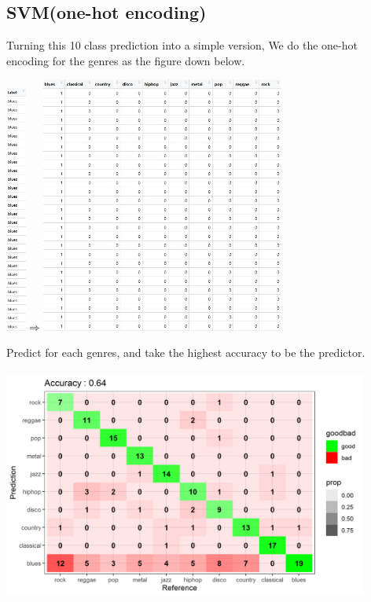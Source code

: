 \documentclass[12pt,a4paper]{article}
\begin{document}
\subsection{SVM(one-hot encoding)}
Turning this 10 class prediction into a simple version, We do the one-hot encoding for the genres as the figure down below.\\
\begin{center}
    \includegraphics[width=0.05\textwidth]{y.jpg}$\Longrightarrow$\includegraphics[width=0.6\textwidth]{y_matrix.jpg}
\end{center}
\newpage
Predict for each genres, and take the highest accuracy to be the predictor.\\
\\
\includegraphics[width=0.9\textwidth]{confusionMatrix_ohencoding_std.png}
\end{document}
